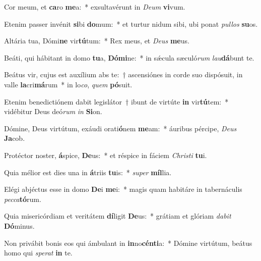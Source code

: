 \item Cor meum, et \textbf{ca}ro \textbf{me}a:~* exsultavérunt in \textit{De}\textit{um} \textbf{vi}vum.
\item Etenim passer invénit \textbf{si}bi \textbf{do}mum:~* et turtur nidum sibi, ubi ponat \textit{pul}\textit{los} \textbf{su}os.
\item Altária tua, Dómi\textbf{ne} vir\textbf{tú}tum:~* Rex meus, et \textit{De}\textit{us} \textbf{me}us.
\item Beáti, qui hábitant in domo \textbf{tu}a, \textbf{Dó}\textbf{mi}ne:~* in sǽcula sæculó\textit{rum} \textit{lau}\textbf{dá}bunt te.
\item Beátus vir, cujus est auxílium abs te:~† ascensiónes in corde suo dispósuit, in valle \textbf{la}cri\textbf{má}rum~* in lo\textit{co}, \textit{quem} \textbf{pó}suit.
\item Etenim benedictiónem dabit legislátor~† ibunt de virtúte \textbf{in} vir\textbf{tú}tem:~* vidébitur Deus deó\textit{rum} \textit{in} \textbf{Si}on.
\item Dómine, Deus virtútum, exáudi orati\textbf{ó}nem \textbf{me}am:~* áuribus pércipe, \textit{De}\textit{us} \textbf{Ja}cob.
\item Protéctor noster, \textbf{á}spice, \textbf{De}us:~* et réspice in fáciem \textit{Chris}\textit{ti} \textbf{tu}i.
\item Quia mélior est dies una in \textbf{á}triis \textbf{tu}is:~* \textit{su}\textit{per} \textbf{míl}lia.
\item Elégi abjéctus esse in domo \textbf{De}i \textbf{me}i:~* magis quam habitáre in tabernáculis \textit{pec}\textit{ca}\textbf{tó}rum.
\item Quia misericórdiam et veritátem \textbf{dí}ligit \textbf{De}us:~* grátiam et glóriam \textit{da}\textit{bit} \textbf{Dó}minus.
\item Non privábit bonis eos qui ámbulant in \textbf{in}no\textbf{cén}\textbf{ti}a:~* Dómine virtútum, beátus homo qui \textit{spe}\textit{rat} \textbf{in} te.

